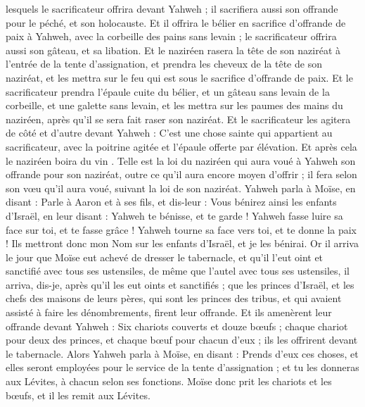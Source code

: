 \begin{multicols}{2}
lesquels le sacrificateur offrira devant Yahweh ; il sacrifiera aussi son offrande pour le péché, et son holocauste.
Et il offrira le bélier en sacrifice d'offrande de paix à Yahweh, avec la corbeille des pains sans levain ; le sacrificateur offrira aussi son gâteau, et sa libation.
Et le naziréen rasera la tête de son naziréat à l'entrée de la tente d'assignation, et prendra les cheveux de la tête de son naziréat, et les mettra sur le feu qui est sous le sacrifice d'offrande de paix.
Et le sacrificateur prendra l'épaule cuite du bélier, et un gâteau sans levain de la corbeille, et une galette sans levain, et les mettra sur les paumes des mains du naziréen, après qu'il se sera fait raser son naziréat.
Et le sacrificateur les agitera de côté et d'autre devant Yahweh : C'est une chose sainte qui appartient au sacrificateur, avec la poitrine agitée et l'épaule offerte par élévation. Et après cela le naziréen boira du vin
.
Telle est la loi du naziréen qui aura voué à Yahweh son offrande pour son naziréat, outre ce qu'il aura encore moyen d'offrir ; il fera selon son vœu qu'il aura voué, suivant la loi de son naziréat.
Yahweh parla à Moïse, en disant :
Parle à Aaron et à ses fils, et dis-leur : Vous bénirez ainsi les enfants d'Israël, en leur disant :
Yahweh te bénisse, et te garde !
Yahweh fasse luire sa face sur toi, et te fasse grâce !
Yahweh tourne sa face vers toi, et te donne la paix !
Ils mettront donc mon Nom sur les enfants d'Israël, et je les bénirai.
\VerseOne{}Or il arriva le jour que Moïse eut achevé de dresser le tabernacle, et qu'il l'eut oint et sanctifié avec tous ses ustensiles, de même que l'autel avec tous ses ustensiles, il arriva, dis-je, après qu'il les eut oints et sanctifiés ;
que les princes d'Israël, et les chefs des maisons de leurs pères, qui sont les princes des tribus, et qui avaient assisté à faire les dénombrements, firent leur offrande.
Et ils amenèrent leur offrande devant Yahweh : Six chariots couverts et douze bœufs ; chaque chariot pour deux des princes, et chaque bœuf pour chacun d'eux ; ils les offrirent devant le tabernacle.
Alors Yahweh parla à Moïse, en disant :
Prends d'eux ces choses, et elles seront employées pour le service de la tente d'assignation ; et tu les donneras aux Lévites, à chacun selon ses fonctions.
Moïse donc prit les chariots et les bœufs, et il les remit aux Lévites.

\end{multicols}
